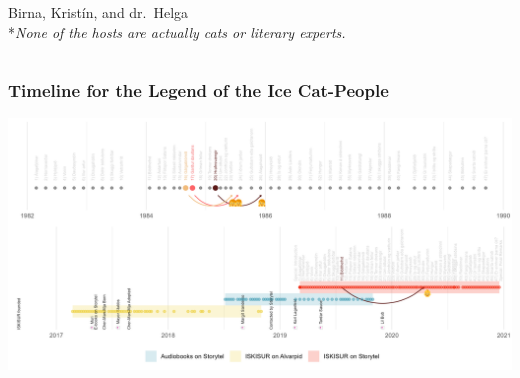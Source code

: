 \begin{frame}
\begin{columns}[T]
\begin{column}{0.45\textwidth}
            \vfill
            Birna, Kristín, and dr.~Helga\\
            \vspace{12pt}
            \footnotesize{*\emph{None of the hosts are actually cats or literary experts.}}
        \end{column}
    \end{columns}
\end{frame}

\begin{frame}
    \frametitle{Timeline for the Legend of the Ice Cat-People}
    \includegraphics[width=\textwidth]{../R/figures/timeline}
\end{frame}
